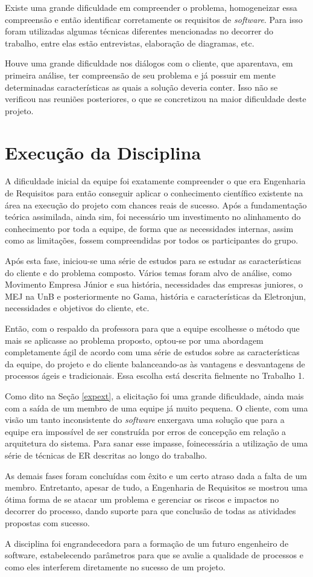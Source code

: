 Existe uma grande dificuldade em compreender o problema, homogeneizar essa compreensão e então identificar corretamente os requisitos de \textit{software}. Para isso foram utilizadas algumas técnicas diferentes mencionadas no decorrer do trabalho, entre elas estão entrevistas, elaboração de diagramas, etc.

Houve uma grande dificuldade nos diálogos com o cliente, que aparentava, em primeira análise, ter compreensão de seu problema e já possuir em mente determinadas características as quais a solução deveria conter. Isso não se verificou nas reuniões posteriores, o que se concretizou na maior dificuldade deste projeto.

\section{Execução da Disciplina}

A dificuldade inicial da equipe foi exatamente compreender o que era Engenharia de Requisitos para então conseguir aplicar o conhecimento científico existente na área na execução do projeto com chances reais de sucesso. Após a fundamentação teórica assimilada, ainda sim, foi necessário um investimento no alinhamento do conhecimento por toda a equipe, de forma que as necessidades internas, assim como as limitações, fossem compreendidas por todos os participantes do grupo.

Após esta fase, iniciou-se uma série de estudos para se estudar as características do cliente e do problema composto. Vários temas foram alvo de análise, como Movimento Empresa Júnior e sua história, necessidades das empresas juniores, o MEJ na UnB e posteriormente no Gama, história e características da Eletronjun, necessidades e objetivos do cliente, etc.

Então, com o respaldo da professora para que a equipe escolhesse o método que mais se aplicasse ao problema proposto, optou-se por uma abordagem completamente ágil de acordo com uma série de estudos sobre as características da equipe, do projeto e do cliente balanceando-as às vantagens e desvantagens de processos ágeis e tradicionais. Essa escolha está descrita fielmente no Trabalho 1.

Como dito na Seção \ref{expext}, a elicitação foi uma grande dificuldade, ainda mais com a saída de um membro de uma equipe já muito pequena. O cliente, com uma visão um tanto inconsistente do \textit{software} enxergava uma solução que para a equipe era impossível de ser construída por erros de concepção em relação a arquitetura do sistema. Para sanar esse impasse, foinecessária a utilização de uma série de técnicas de ER descritas ao longo do trabalho.

As demais fases foram concluídas com êxito e um certo atraso dada a falta de um membro. Entretanto, apesar de tudo, a Engenharia de Requisitos se mostrou uma ótima forma de se atacar um problema e gerenciar os riscos e impactos no decorrer do processo, dando suporte para que conclusão de todas as atividades propostas com sucesso.

A disciplina foi engrandecedora para a formação de um futuro engenheiro de software, estabelecendo parâmetros para que se avalie a qualidade de processos e como eles interferem diretamente no sucesso de um projeto.
